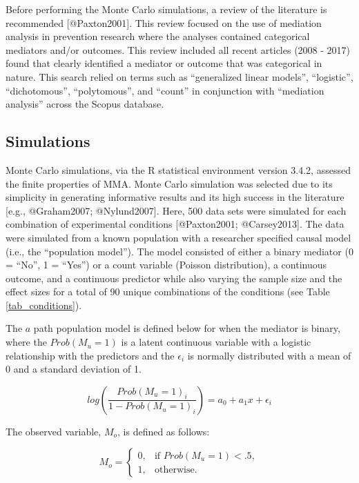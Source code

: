 \documentclass[]{article}
\begin{document}
Before performing the Monte Carlo simulations, a review of the
literature is recommended {[}@Paxton2001{]}. This review focused on the
use of mediation analysis in prevention research where the analyses
contained categorical mediators and/or outcomes. This review included
all recent articles (2008 - 2017) found that clearly identified a
mediator or outcome that was categorical in nature. This search relied
on terms such as ``generalized linear models'', ``logistic'',
``dichotomous'', ``polytomous'', and ``count'' in conjunction with
``mediation analysis'' across the Scopus database.

\subsection{Simulations}\label{simulations}

Monte Carlo simulations, via the R statistical environment version
3.4.2, assessed the finite properties of MMA. Monte Carlo simulation was
selected due to its simplicity in generating informative results and its
high success in the literature {[}e.g., @Graham2007; @Nylund2007{]}.
Here, 500 data sets were simulated for each combination of experimental
conditions {[}@Paxton2001; @Carsey2013{]}. The data were simulated from
a known population with a researcher specified causal model (i.e., the
``population model''). The model consisted of either a binary mediator
(0 = ``No'', 1 = ``Yes'') or a count variable (Poisson distribution), a
continuous outcome, and a continuous predictor while also varying the
sample size and the effect sizes for a total of 90 unique combinations
of the conditions (see Table \ref{tab_conditions}).

The \(a\) path population model is defined below for when the mediator
is binary, where the \(Prob(M_{u} = 1)\) is a latent continuous variable
with a logistic relationship with the predictors and the \(\epsilon_i\)
is normally distributed with a mean of 0 and a standard deviation of 1.

\begin{equation}
log(\frac{Prob(M_{u} = 1)_{i}}{1 - Prob(M_{u} = 1)_{i}}) = a_0 + a_1 x + \epsilon_i
\end{equation}

\noindent The observed variable, \(M_{o}\), is defined as follows:

\begin{equation}
M_{o} = \begin{cases}
            0, & \text{if } Prob(M_u = 1) < .5, \\
            1, & \text{otherwise}.
         \end{cases}
\end{equation}
\end{document}
